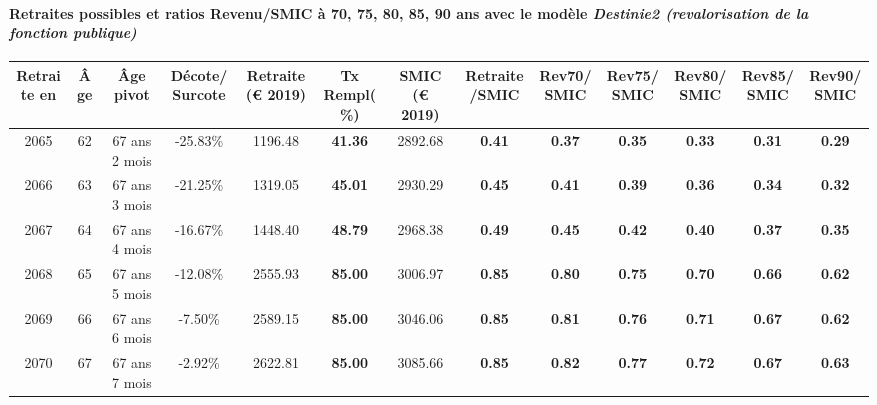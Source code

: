 \paragraph{Retraites possibles et ratios Revenu/SMIC à 70, 75, 80, 85, 90 ans avec le modèle \emph{Destinie2 (revalorisation de la fonction publique)}}  
 
{ \scriptsize \begin{center} 
\begin{tabular}[htb]{|c|c||c|c||c|c||c||c|c|c|c|c|c|} 
\hline 
 Retraite en &  Âge &  Âge pivot &  Décote/Surcote &  Retraite (\euro{} 2019) &  Tx Rempl(\%) &  SMIC (\euro{} 2019) &  Retraite/SMIC &  Rev70/SMIC &  Rev75/SMIC &  Rev80/SMIC &  Rev85/SMIC &  Rev90/SMIC \\ 
\hline \hline 
 2065 &  62 &  67 ans 2 mois &  -25.83\% &  1196.48 &  {\bf 41.36} &  2892.68 &  {\bf {\color{red} 0.41}} &  {\bf {\color{red} 0.37}} &  {\bf {\color{red} 0.35}} &  {\bf {\color{red} 0.33}} &  {\bf {\color{red} 0.31}} &  {\bf {\color{red} 0.29}} \\ 
\hline 
 2066 &  63 &  67 ans 3 mois &  -21.25\% &  1319.05 &  {\bf 45.01} &  2930.29 &  {\bf {\color{red} 0.45}} &  {\bf {\color{red} 0.41}} &  {\bf {\color{red} 0.39}} &  {\bf {\color{red} 0.36}} &  {\bf {\color{red} 0.34}} &  {\bf {\color{red} 0.32}} \\ 
\hline 
 2067 &  64 &  67 ans 4 mois &  -16.67\% &  1448.40 &  {\bf 48.79} &  2968.38 &  {\bf {\color{red} 0.49}} &  {\bf {\color{red} 0.45}} &  {\bf {\color{red} 0.42}} &  {\bf {\color{red} 0.40}} &  {\bf {\color{red} 0.37}} &  {\bf {\color{red} 0.35}} \\ 
\hline 
 2068 &  65 &  67 ans 5 mois &  -12.08\% &  2555.93 &  {\bf 85.00} &  3006.97 &  {\bf {\color{red} 0.85}} &  {\bf {\color{red} 0.80}} &  {\bf {\color{red} 0.75}} &  {\bf {\color{red} 0.70}} &  {\bf {\color{red} 0.66}} &  {\bf {\color{red} 0.62}} \\ 
\hline 
 2069 &  66 &  67 ans 6 mois &  -7.50\% &  2589.15 &  {\bf 85.00} &  3046.06 &  {\bf {\color{red} 0.85}} &  {\bf {\color{red} 0.81}} &  {\bf {\color{red} 0.76}} &  {\bf {\color{red} 0.71}} &  {\bf {\color{red} 0.67}} &  {\bf {\color{red} 0.62}} \\ 
\hline 
 2070 &  67 &  67 ans 7 mois &  -2.92\% &  2622.81 &  {\bf 85.00} &  3085.66 &  {\bf {\color{red} 0.85}} &  {\bf {\color{red} 0.82}} &  {\bf {\color{red} 0.77}} &  {\bf {\color{red} 0.72}} &  {\bf {\color{red} 0.67}} &  {\bf {\color{red} 0.63}} \\ 
\hline 
\hline 
\end{tabular} 
\end{center} } 

